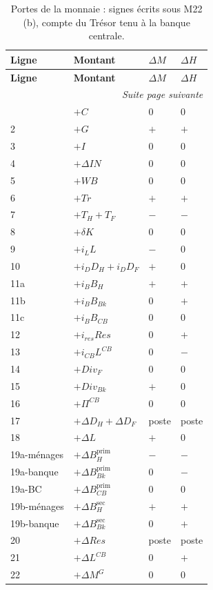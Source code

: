 \documentclass{article}
\begin{document}
\begin{longtable}{llll}
\caption{Portes de la monnaie : signes écrits sous M22 (b), compte du Trésor tenu à la banque centrale.}\label{tab:portes-monnaie}\\
\toprule
\textbf{Ligne} & \textbf{Montant} & $\Delta M$ & $\Delta H$\\
\midrule
\endfirsthead
\toprule
\textbf{Ligne} & \textbf{Montant} & $\Delta M$ & $\Delta H$\\
\midrule
\endhead
\multicolumn{4}{r}{\emph{Suite page suivante}}\\
\endfoot
1 & $+C$ & 0 & 0\\
2 & $+G$ & $+$ & $+$\\
3 & $+I$ & 0 & 0\\
4 & $+\Delta \mathit{IN}$ & 0 & 0\\
5 & $+\mathit{WB}$ & 0 & 0\\
6 & $+\mathit{Tr}$ & $+$ & $+$\\
7 & $+T_H + T_F$ & $-$ & $-$\\
8 & $+\delta K$ & 0 & 0\\
9 & $+i_L L$ & $-$ & 0\\
10 & $+i_D D_H + i_D D_F$ & $+$ & 0\\
11a & $+i_B B_H$ & $+$ & $+$\\
11b & $+i_B B_{Bk}$ & 0 & $+$\\
11c & $+i_B B_{CB}$ & 0 & 0\\
12 & $+i_{res} \mathit{Res}$ & 0 & $+$\\
13 & $+i_{CB} L^{CB}$ & 0 & $-$\\
14 & $+\mathit{Div}_F$ & 0 & 0\\
15 & $+\mathit{Div}_{Bk}$ & $+$ & 0\\
16 & $+\Pi^{CB}$ & 0 & 0\\
17 & $+\Delta D_H + \Delta D_F$ & poste & poste\\
18 & $+\Delta L$ & $+$ & 0\\
19a-ménages & $+\Delta B_H^{\mathrm{prim}}$ & $-$ & $-$\\
19a-banque & $+\Delta B_{Bk}^{\mathrm{prim}}$ & 0 & $-$\\
19a-BC & $+\Delta B_{CB}^{\mathrm{prim}}$ & 0 & 0\\
19b-ménages & $+\Delta B_H^{\mathrm{sec}}$ & $+$ & $+$\\
19b-banque & $+\Delta B_{Bk}^{\mathrm{sec}}$ & 0 & $+$\\
20 & $+\Delta \mathit{Res}$ & poste & poste\\
21 & $+\Delta L^{CB}$ & 0 & $+$\\
22 & $+\Delta M^G$ & 0 & 0\\
\bottomrule
\end{longtable}
\end{document}
